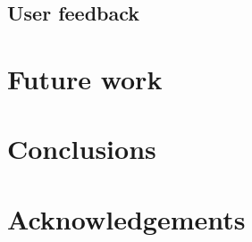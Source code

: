 \documentclass[a4paper,11pt,twocolumn]{article}
\begin{document}
\subsection{User feedback}

\section{Future work}

\section{Conclusions}

\section*{Acknowledgements}



\end{document}
